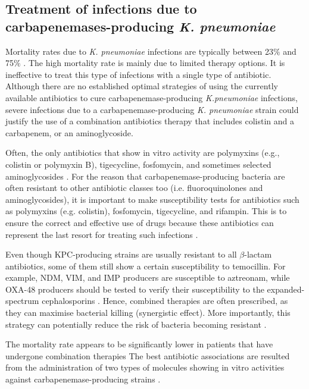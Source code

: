 \documentclass[11pt]{report}
\begin{document}
\subsection{Treatment of infections due to carbapenemases-producing \emph{K. pneumoniae}}
Mortality rates due to \emph{K. pneumoniae} infections are typically between 23$\%$ and 75$\%$ \cite{karaiskos2014multidrug}.
The high mortality rate is mainly due to limited therapy options.
It is ineffective to treat this type of infections with a single type of antibiotic.
Although there are no established optimal strategies of using the currently available antibiotics to cure carbapenemase-producing \emph{K.pneumoniae} infections, severe infections due to a carbapenemase-producing \emph{K. pneumoniae} strain could justify the use of a combination antibiotics therapy that includes colistin and a carbapenem, or an aminoglycoside.

Often, the only antibiotics that show in vitro activity are polymyxins (e.g., colistin or polymyxin B), tigecycline, fosfomycin, and sometimes selected aminoglycosides \cite{rodriguez2015diagnosis}.
For the reason that carbapenemase-producing bacteria are often resistant to other antibiotic classes too (i.e. fluoroquinolones and aminoglycosides), it is important to make susceptibility tests for antibiotics such as polymyxins (e.g. colistin), fosfomycin, tigecycline, and rifampin.
This is to ensure the correct and effective use of drugs because these antibiotics can represent the last resort for treating such infections \cite{adams2009activity}.

Even though KPC-producing strains are usually resistant to all $\beta$-lactam antibiotics, some of them still show a certain susceptibility to temocillin.
For example, NDM, VIM, and IMP producers are susceptible to aztreonam, while OXA-48 producers should be tested to verify their susceptibility to the expanded-spectrum cephalosporins \cite{girlich2009ctx}.
Hence, combined therapies are often prescribed, as they can maximise bacterial killing (synergistic effect).
More importantly, this strategy can potentially reduce the risk of bacteria becoming resistant \cite{Pitout2015}.

The mortality rate appears to be significantly lower in patients that have undergone combination therapies \cite{tzouvelekis2014treating, zavascki2013combination}
The best antibiotic associations are resulted from the administration of two types of molecules showing in vitro activities against carbapenemase-producing strains \cite{falagas2013antibiotic, tzouvelekis2014treating}.
\end{document}
